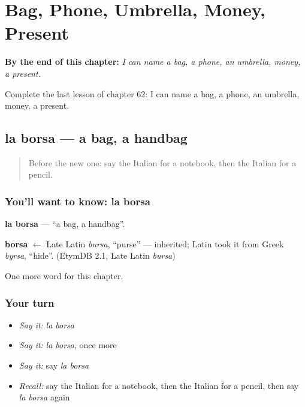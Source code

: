 
\chapter{Bag, Phone, Umbrella, Money, Present}
\label{ch:it-bag-phone-umbrella-money-present}

\begin{chapteropening}
\textbf{By the end of this chapter:} \emph{I can name a bag, a phone, an umbrella, money, a present.}

Complete the last lesson of chapter 62: I can name a bag, a phone, an umbrella, money, a present.
\end{chapteropening}

\section[la borsa]{la borsa — a bag, a handbag}

\label{lesson:IT-C62-borsa}



\begin{quote}
Before the new one: say the Italian for a notebook, then the Italian for a pencil.
\end{quote}

\subsection*{You'll want to know: la borsa}
\textbf{la borsa} — \textquotedblleft{}a bag, a handbag\textquotedblright{}.

\begin{cousinweb}
\textbf{borsa} $\leftarrow$ Late Latin \emph{bursa}, \textquotedblleft{}purse\textquotedblright{} — inherited; Latin took it from Greek \emph{byrsa}, \textquotedblleft{}hide\textquotedblright{}. (EtymDB 2.1, Late Latin \emph{bursa})
\end{cousinweb}

\begin{grammarlens}[title={What you've built}]
One more word for this chapter.
\end{grammarlens}

\subsection*{Your turn}
\begin{itemize}
\raggedright
  \item \emph{Say it:} \emph{la borsa}
  \item \emph{Say it:} \emph{la borsa}, once more
  \item \emph{Say it:} say \emph{la borsa}
  \item \emph{Recall:} say the Italian for a notebook, then the Italian for a pencil, then say \emph{la borsa} again
\end{itemize}

